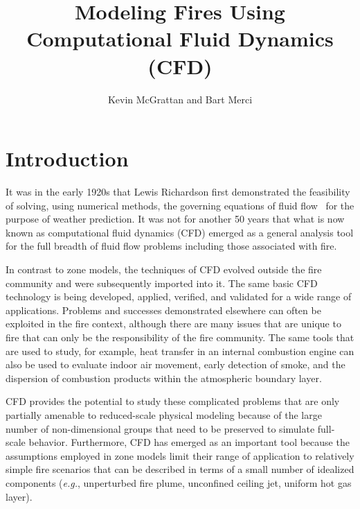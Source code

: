 \documentclass[graybox]{svmult}
\begin{document}
\title*{Modeling Fires Using Computational Fluid Dynamics (CFD)}

\author{Kevin McGrattan and Bart Merci}


\maketitle


\section{Introduction}

It was in the early 1920s that Lewis Richardson first demonstrated the feasibility of solving, using numerical methods, the governing equations of fluid flow~\cite{Richardson}  for the purpose of weather prediction. It was not for another 50 years that what is now known as computational fluid dynamics (CFD) emerged as a general analysis tool for the full breadth of fluid flow problems including those associated with fire.

In contrast to zone models, the techniques of CFD evolved outside the fire community and were subsequently imported into it. The same basic CFD technology is being developed, applied, verified, and validated for a wide range of applications. Problems and successes demonstrated elsewhere can often be exploited in the fire context, although there are many issues that are unique to fire that can only be the responsibility of the fire community. The same tools that are used to study, for example, heat transfer in an internal combustion engine can also be used to evaluate indoor air movement, early detection of smoke, and the dispersion of combustion products within the atmospheric boundary layer.

CFD provides the potential to study these complicated problems that are only partially amenable to reduced-scale physical modeling because of the large number of non-dimensional groups that need to be preserved to simulate full-scale behavior. Furthermore, CFD has emerged as an important tool because the assumptions employed in zone models limit their range of application to relatively simple fire scenarios that can be described in terms of a small number of idealized components ({\em e.g.}, unperturbed fire plume, unconfined ceiling jet, uniform hot gas layer).
\end{document}
